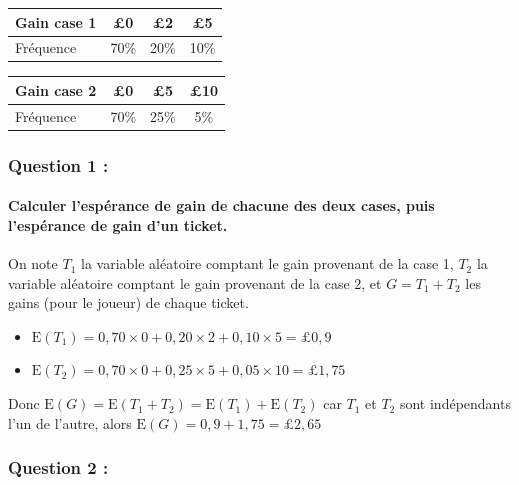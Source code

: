 \documentclass[a4paper, 12pt]{article}
\begin{document}
\begin{center}
\begin{tabular}{ |l|c|c|c| }
    \hline
    Gain case 1 & £0 & £2 & £5 \\
    \hline
    Fréquence & 70\% & 20\% & 10\% \\
    \hline
\end{tabular}
\hspace{1cm}
\begin{tabular}{ |l|c|c|c| }
    \hline
    Gain case 2 & £0 & £5 & £10 \\
    \hline
    Fréquence & 70\% & 25\% & 5\% \\
    \hline
\end{tabular}
\end{center}

{}
\subsubsection*{Question 1 :}
\paragraph*{Calculer l'espérance de gain de chacune des deux cases, puis l'espérance de gain d'un ticket.\\[5mm]}

On note $T_1$ la variable aléatoire comptant le gain provenant de la case 1, $T_2$ la variable aléatoire comptant le gain provenant de la case 2, 
et $G = T_1 + T_2$ les gains (pour le joueur) de chaque ticket. \\
\begin{itemize}
    \item[\textbullet] $\text{E}(T_1) = 0,70 \times 0 + 0,20 \times 2 + 0,10 \times 5 = \pounds 0,9$ \\
    \item[\textbullet] $\text{E}(T_2) = 0,70 \times 0 + 0,25 \times 5 + 0,05 \times 10 = \pounds 1,75$ \\
\end{itemize}
Donc $\text{E}(G) = \text{E}(T_1 + T_2) = \text{E}(T_1) + \text{E}(T_2)$ car $T_1$ et $T_2$ sont indépendants l'un de l'autre, alors $\text{E}(G) = 0,9 + 1,75 = \pounds 2,65$

{}
\subsubsection*{Question 2 :}
\end{document}
